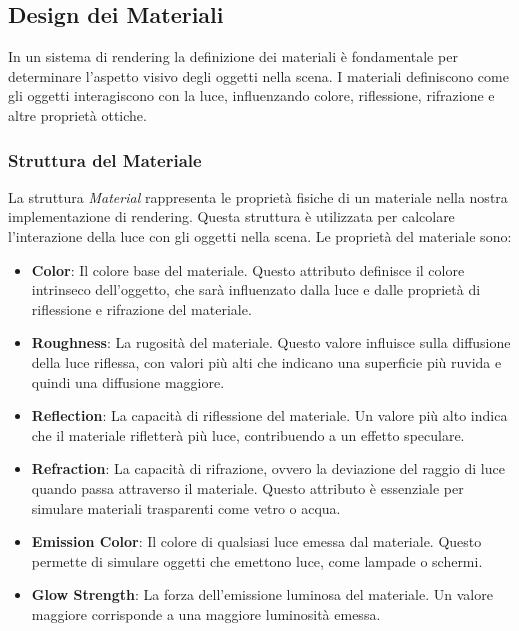 \documentclass[12pt]{article}
\begin{document}
\subsection{Design dei Materiali}
In un sistema di rendering la definizione dei materiali è fondamentale per determinare l'aspetto visivo degli oggetti nella scena. I materiali definiscono come gli oggetti interagiscono con la luce, influenzando colore, riflessione, rifrazione e altre proprietà ottiche.

\subsubsection{Struttura del Materiale}
La struttura \textit{Material} rappresenta le proprietà fisiche di un materiale nella nostra implementazione di rendering. Questa struttura è utilizzata per calcolare l'interazione della luce con gli oggetti nella scena. Le proprietà del materiale sono:

\begin{itemize}
\item \textbf{Color}: Il colore base del materiale. Questo attributo definisce il colore intrinseco dell'oggetto, che sarà influenzato dalla luce e dalle proprietà di riflessione e rifrazione del materiale.

\item \textbf{Roughness}: La rugosità del materiale. Questo valore influisce sulla diffusione della luce riflessa, con valori più alti che indicano una superficie più ruvida e quindi una diffusione maggiore.

\item \textbf{Reflection}: La capacità di riflessione del materiale. Un valore più alto indica che il materiale rifletterà più luce, contribuendo a un effetto speculare.

\item \textbf{Refraction}: La capacità di rifrazione, ovvero la deviazione del raggio di luce quando passa attraverso il materiale. Questo attributo è essenziale per simulare materiali trasparenti come vetro o acqua.

\item \textbf{Emission Color}: Il colore di qualsiasi luce emessa dal materiale. Questo permette di simulare oggetti che emettono luce, come lampade o schermi.

\item \textbf{Glow Strength}: La forza dell'emissione luminosa del materiale. Un valore maggiore corrisponde a una maggiore luminosità emessa.
\end{itemize}
\end{document}
